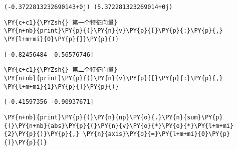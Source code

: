     \begin{Verbatim}[commandchars=\\\{\}]
(-0.3722813232690143+0j) (5.372281323269014+0j)
    \end{Verbatim}

    \begin{tcolorbox}[breakable, size=fbox, boxrule=1pt, pad at break*=1mm,colback=cellbackground, colframe=cellborder]
\begin{Verbatim}[commandchars=\\\{\}]
\PY{c+c1}{\PYZsh{} 第一个特征向量}
\PY{n+nb}{print}\PY{p}{(}\PY{n}{v}\PY{p}{[}\PY{p}{:}\PY{p}{,} \PY{l+m+mi}{0}\PY{p}{]}\PY{p}{)}
\end{Verbatim}
\end{tcolorbox}

    \begin{Verbatim}[commandchars=\\\{\}]
[-0.82456484  0.56576746]
    \end{Verbatim}

    \begin{tcolorbox}[breakable, size=fbox, boxrule=1pt, pad at break*=1mm,colback=cellbackground, colframe=cellborder]
\begin{Verbatim}[commandchars=\\\{\}]
\PY{c+c1}{\PYZsh{} 第二个特征向量}
\PY{n+nb}{print}\PY{p}{(}\PY{n}{v}\PY{p}{[}\PY{p}{:}\PY{p}{,} \PY{l+m+mi}{1}\PY{p}{]}\PY{p}{)}
\end{Verbatim}
\end{tcolorbox}

    \begin{Verbatim}[commandchars=\\\{\}]
[-0.41597356 -0.90937671]
    \end{Verbatim}

    \begin{tcolorbox}[breakable, size=fbox, boxrule=1pt, pad at break*=1mm,colback=cellbackground, colframe=cellborder]
\begin{Verbatim}[commandchars=\\\{\}]
\PY{n+nb}{print}\PY{p}{(}\PY{n}{np}\PY{o}{.}\PY{n}{sum}\PY{p}{(}\PY{n+nb}{abs}\PY{p}{(}\PY{n}{v}\PY{o}{*}\PY{o}{*}\PY{l+m+mi}{2}\PY{p}{)}\PY{p}{,} \PY{n}{axis}\PY{o}{=}\PY{l+m+mi}{0}\PY{p}{)}\PY{p}{)}
\end{Verbatim}
\end{tcolorbox}

